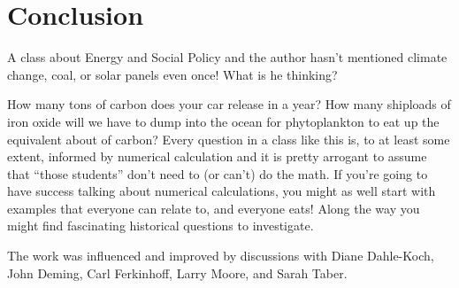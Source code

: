 \documentclass[jou]{apa7}
\begin{document}
\section{Conclusion}
A class about Energy and Social Policy and the author hasn't mentioned climate change, coal, or solar panels even once!  What is he thinking?  

How many tons of carbon does your car release in a year? How many shiploads of iron oxide will we have to dump into the ocean for phytoplankton to eat up the equivalent about of carbon?  Every question in a class like this is, to at least some extent, informed by numerical calculation and it is pretty arrogant to assume that ``those students'' don't need to (or can't) do the math.  If you're going to have success talking about numerical calculations, you might as well start with examples that everyone can relate to, and everyone eats!  Along the way you might find fascinating historical questions to investigate.   


The work was influenced and improved by discussions with 
Diane Dahle-Koch, 
John Deming, 
Carl Ferkinhoff, 
Larry Moore, 
and Sarah Taber.
\end{document}
